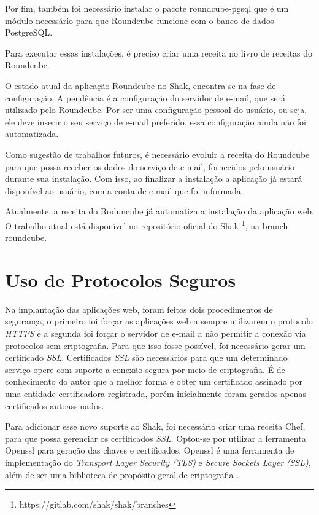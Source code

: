 Por fim, também foi necessário instalar o pacote roundcube-pgsql que é um módulo 
necessário para que Roundcube funcione com o banco de dados PostgreSQL.
 
Para executar essas instalações, é preciso criar uma receita no livro de receitas
do Roundcube. 

O estado atual da aplicação Roundcube no Shak, encontra-se na fase de configuração. A pendência 
é a configuração do servidor de e-mail, que será utilizado pelo Roundcube. Por ser
uma configuração pessoal do usuário, ou seja, ele deve inserir o seu serviço
de e-mail preferido, essa configuração ainda não foi automatizada. 

Como sugestão de trabalhos futuros, é necessário evoluir a receita do Roundcube 
para que possa receber os dados do serviço de e-mail, fornecidos pelo usuário 
durante sua instalação. Com isso, ao finalizar a instalação a aplicação já 
estará disponível ao usuário, com a conta de e-mail que foi informada.

Atualmente, a receita do Roduncube já automatiza a instalação da aplicação web. 
O trabalho atual está disponível no repositório oficial do Shak \footnote{https://gitlab.com/shak/shak/branches}, na branch roundcube.

\section{Uso de Protocolos Seguros}
\label{sub:seguranca}

Na implantação das aplicações web, foram feitos dois procedimentos de segurança, o primeiro
foi forçar as aplicações web a sempre utilizarem o protocolo \textit{HTTPS} e a segunda foi forçar o
servidor de e-mail a não permitir a conexão via protocolos sem criptografia. Para que 
isso fosse possível, foi necessário gerar um certificado \textit{SSL}. Certificados 
\textit{SSL} são necessários para que um determinado serviço opere com suporte 
a conexão segura por meio de criptografia.
É de conhecimento do autor que a melhor forma é obter um certificado assinado
por uma entidade certificadora registrada, porém inicialmente foram gerados apenas certificados
autoassinados.

Para adicionar esse novo suporte ao Shak, foi necessário criar uma receita Chef,
para que possa gerenciar os certificados \textit{SSL}. Optou-se por utilizar a ferramenta
Openssl para geração das chaves e certificados, Openssl é uma ferramenta de
implementação do \textit{Transport Layer Security} \textit{(TLS)} e \textit{Secure Sockets Layer} \textit{(SSL)},
além de ser uma biblioteca de propósito geral de criptografia \cite{openssl}.

